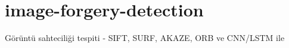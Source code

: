 \chapter{image-\/forgery-\/detection }
\hypertarget{md__r_e_a_d_m_e}{}\label{md__r_e_a_d_m_e}
\label{md__r_e_a_d_m_e_autotoc_md0}%
%


Görüntü sahteciliği tespiti -\/ SIFT, SURF, AKAZE, ORB ve CNN/\+\+LSTM ile 
